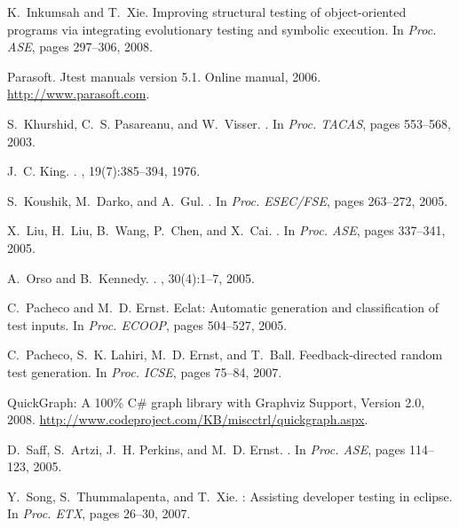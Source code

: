 \documentclass{sig-alternate}
\begin{document}
\begin{thebibliography}{10}
K.~Inkumsah and T.~Xie.
\newblock Improving structural testing of object-oriented programs via
  integrating evolutionary testing and symbolic execution.
\newblock In {\em Proc. ASE}, pages 297--306, 2008.

Parasoft. {J}test manuals version 5.1. {O}nline manual, 2006.
\newblock \url{http://www.parasoft.com}.

S.~Khurshid, C.~S. Pasareanu, and W.~Visser.
.
\newblock In {\em Proc. TACAS}, pages 553--568, 2003.

J.~C. King.
.
, 19(7):385--394, 1976.

S.~Koushik, M.~Darko, and A.~Gul.
.
\newblock In {\em Proc. ESEC/FSE}, pages 263--272, 2005.

X.~Liu, H.~Liu, B.~Wang, P.~Chen, and X.~Cai.
.
\newblock In {\em Proc. ASE}, pages 337--341, 2005.

A.~Orso and B.~Kennedy.
.
, 30(4):1--7, 2005.

C.~Pacheco and M.~D. Ernst.
\newblock Eclat: Automatic generation and classification of test inputs.
\newblock In {\em Proc. ECOOP}, pages 504--527, 2005.

C.~Pacheco, S.~K. Lahiri, M.~D. Ernst, and T.~Ball.
\newblock Feedback-directed random test generation.
\newblock In {\em Proc. ICSE}, pages 75--84, 2007.

{QuickGraph: A 100\% C\# graph library with Graphviz Support, Version 2.0},
  2008.
\newblock \url{http://www.codeproject.com/KB/miscctrl/quickgraph.aspx}.

D.~Saff, S.~Artzi, J.~H. Perkins, and M.~D. Ernst.
.
\newblock In {\em Proc. ASE}, pages 114--123, 2005.

Y.~Song, S.~Thummalapenta, and T.~Xie.
: Assisting developer testing in eclipse.
\newblock In {\em Proc. ETX}, pages 26--30, 2007.


\end{thebibliography}
\end{document}
